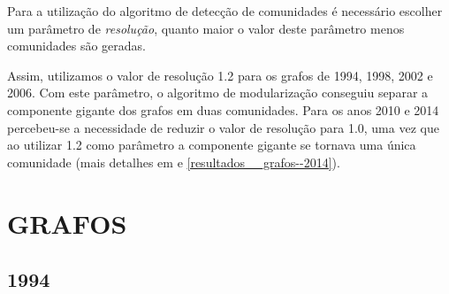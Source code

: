 Para a utilização do algoritmo de detecção de comunidades é necessário escolher um parâmetro de \emph{resolução}, quanto maior o valor deste parâmetro menos comunidades são geradas.

Assim, utilizamos o valor de resolução 1.2 para os grafos de 1994, 1998, 2002 e 2006. Com este parâmetro, o algoritmo de modularização conseguiu separar a componente gigante dos grafos em duas comunidades. Para os anos 2010 e 2014 percebeu-se a necessidade de reduzir o valor de resolução para 1.0, uma vez que ao utilizar 1.2 como parâmetro a componente gigante se tornava uma única comunidade (mais detalhes em  e \ref{resultados__grafos--2014}).

\section{\texorpdfstring{\MakeUppercase{Grafos}}{}}
\label{resultados__grafos}


\subsection{1994}
\label{resultados__grafos--1994}

